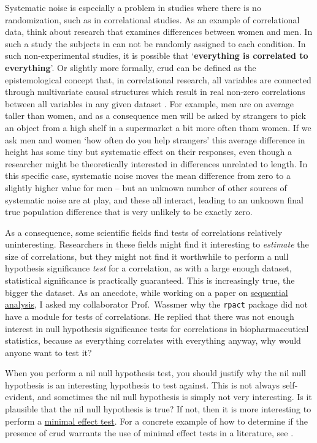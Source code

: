 \documentclass[
  oneside]{book}
\begin{document}
Systematic noise is especially a problem in studies where there is no randomization, such as in correlational studies. As an example of correlational data, think about research that examines differences between women and men. In such a study the subjects in can not be randomly assigned to each condition. In such non-experimental studies, it is possible that `\textbf{everything is correlated to everything}'. Or slightly more formally, crud can be defined as the epistemological concept that, in correlational research, all variables are connected through multivariate causal structures which result in real non-zero correlations between all variables in any given dataset \citep{orben_crud_2020}. For example, men are on average taller than women, and as a consequence men will be asked by strangers to pick an object from a high shelf in a supermarket a bit more often tham women. If we ask men and women `how often do you help strangers' this average difference in height has some tiny but systematic effect on their responses, even though a researcher might be theoretically interested in differences unrelated to length. In this specific case, systematic noise moves the mean difference from zero to a slightly higher value for men -- but an unknown number of other sources of systematic noise are at play, and these all interact, leading to an unknown final true population difference that is very unlikely to be exactly zero.

As a consequence, some scientific fields find tests of correlations relatively uninteresting. Researchers in these fields might find it interesting to \emph{estimate} the size of correlations, but they might not find it worthwhile to perform a null hypothesis significance \emph{test} for a correlation, as with a large enough dataset, statistical significance is practically guaranteed. This is increasingly true, the bigger the dataset. As an anecdote, while working on a paper on \protect\hyperlink{sequential}{sequential analysis}, I asked my collaborator Prof.~Wassmer why the \texttt{rpact} package did not have a module for tests of correlations. He replied that there was not enough interest in null hypothesis significance tests for correlations in biopharmaceutical statistics, because as everything correlates with everything anyway, why would anyone want to test it?

When you perform a nil null hypothesis test, you should justify why the nil null hypothesis is an interesting hypothesis to test against. This is not always self-evident, and sometimes the nil null hypothesis is simply not very interesting. Is it plausible that the nil null hypothesis is true? If not, then it is more interesting to perform a \protect\hyperlink{MET}{minimal effect test}. For a concrete example of how to determine if the presence of crud warrants the use of minimal effect tests in a literature, see \citet{ferguson_providing_2021}.
\end{document}
